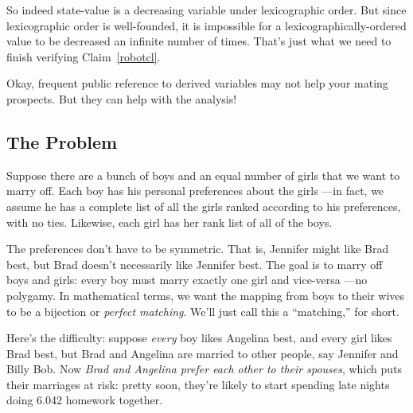 So indeed state-value is a decreasing variable under lexicographic order.
But since lexicographic order is well-founded, it is impossible for a
lexicographically-ordered value to be decreased an infinite number of
times.  That's just what we need to finish verifying Claim~\ref{robotcl}.
\fi

\begin{problems}
\homeworkproblems




\end{problems}

\label{stablemarriagesec}

Okay, frequent public reference to derived variables may not help your
mating prospects.  But they can help with the analysis!

\subsection{The Problem}

Suppose there are a bunch of boys and an equal number of girls that we
want to marry off.  Each boy has his personal preferences about the girls
---in fact, we assume he has a complete list of all the girls ranked
according to his preferences, with no ties.  Likewise, each girl has her
rank list of all of the boys.

The preferences don't have to be symmetric.  That is, Jennifer might like
Brad best, but Brad doesn't necessarily like Jennifer best.  The goal is
to marry off boys and girls: every boy must marry exactly one girl and
vice-versa ---no polygamy.  In mathematical terms, we want the mapping
from boys to their wives to be a bijection or \emph{perfect matching}.
We'll just call this a ``matching,'' for short.

Here's the difficulty: suppose \emph{every} boy likes Angelina best, and
every girl likes Brad best, but Brad and Angelina are married to other
people, say Jennifer and Billy Bob.  Now \emph{Brad and Angelina prefer
each other to their spouses}, which puts their marriages at risk: pretty
soon, they're likely to start spending late nights doing 6.042 homework
together.

